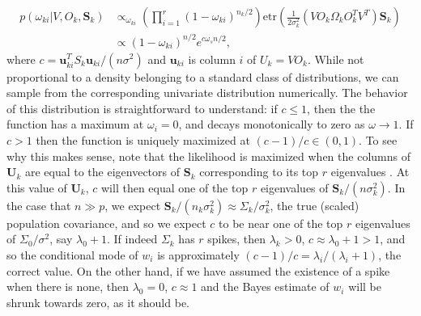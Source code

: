 \documentclass{article}
\newcommand{\bl}[1]{{\mathbf #1}}
\newcommand{\etr}{\text{etr}}
\begin{document}
\begin{align}
p(\omega_{ki}|V, O_k, \bl S_k) &\propto_{\omega_{ki}}
  \left(\prod_{i=1}^r(1-\omega_{ki})^{n_k/2}  \right)
  \etr(\frac{1}{2\sigma_k^2}(VO_k\Omega_kO_k^TV^T)\mathbf{S}_k) \\
&  \propto  (1-\omega_{ki})^{n/2} e^{c \omega_s  n/2},    
\label{eqn:wpost}
\end{align}
%
\noindent where $c = \bl u_{ki}^T S_k \bl u_{ki}/(n \sigma^2)$ and $\bl u_{ki}$ is
column $i$ of $U_k = VO_k$.  While not proportional to a density
belonging to a standard class of distributions, we can sample from the
corresponding univariate distribution numerically.  The behavior of
this distribution is straightforward to understand: if $c\leq 1$, then
the the function has a maximum at $\omega_i =0$, and decays
monotonically to zero as $\omega \rightarrow 1$.  If $c>1$ then the
function is uniquely maximized at $(c-1)/c \in (0,1)$.  To see why
this makes sense, note that the likelihood is maximized when the
columns of $\bl U_k$ are equal to the eigenvectors of $\bl S_k$
corresponding to its top $r$ eigenvalues
\citep{Tipping1999}. At this value of $\bl U_k$, $c$ will then
equal one of the top $r$ eigenvalues of $\bl S_k/(n\sigma_k^2)$.  In the
case that $n\gg p$, we expect
$\bl S_k/(n_k\sigma_k^2)\approx \Sigma_k/\sigma_k^2$, the true (scaled)
population covariance, and so we expect $c$ to be near one of the top
$r$ eigenvalues of $\Sigma_0/\sigma^2$, say $\lambda_0+1$.  If indeed
$\Sigma_k$ has $r$ spikes, then $\lambda_k>0$,
$c \approx \lambda_0 +1 > 1$, and so the conditional mode of $w_i$ is
approximately $(c-1)/c = \lambda_i/(\lambda_i+1)$, the correct value.
On the other hand, if we have assumed the existence of a spike when
there is none, then $\lambda_0=0$, $c\approx 1$ and the Bayes estimate
of $w_i$ will be shrunk towards zero, as it should be.





\end{document}
